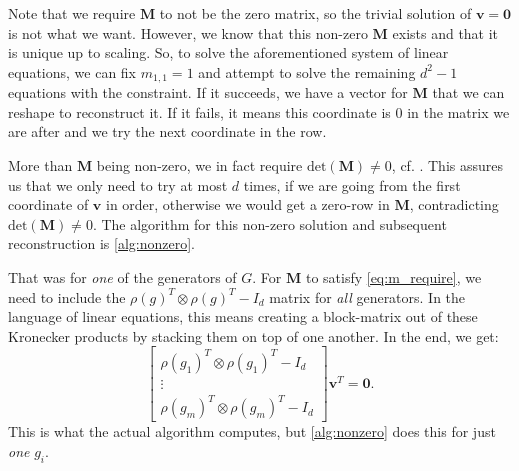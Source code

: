 \documentclass[11pt]{article}
\begin{document}
Note that we require $\mathbf{M}$ to not be the zero matrix, so the trivial solution of $\mathbf{v} = \mathbf{0}$
is not what we want. However, we know that this non-zero $\mathbf{M}$ exists and that it is unique
up to scaling. So, to solve the aforementioned system of linear equations, we can fix $m_{1,1} = 1$
and attempt to solve the remaining $d^2-1$ equations with the constraint. If it succeeds, we have
a vector for $\mathbf{M}$ that we can reshape to reconstruct it. If it fails, it means this coordinate
is $0$ in the matrix we are after and we try the next coordinate in the row.

More than $\mathbf{M}$ being non-zero, we in fact require $\text{det}(\mathbf{M}) \neq 0$, cf. \cite[Proof of Lemma 3.1]{Pas21}.
This assures us that we only need to try at most $d$ times, if we are going from the first coordinate
of $\mathbf{v}$ in order, otherwise we would get a zero-row in $\mathbf{M}$, contradicting $\text{det}(\mathbf{M}) \neq 0$.
The algorithm for this non-zero solution and subsequent reconstruction is \cref{alg:nonzero}.

That was for \textit{one} of the generators of $G$. For $\mathbf{M}$ to satisfy \cref{eq:m_require},
we need to include the $\rho(g)^T \otimes \rho(g)^T - I_d$ matrix for \textit{all} generators. In
the language of linear equations, this means creating a block-matrix out of these Kronecker products
by stacking them on top of one another. In the end, we get:
\[\begin{bmatrix} \rho(g_1)^T \otimes \rho(g_1)^T - I_d\\ \vdots \\ \rho(g_m)^T \otimes \rho(g_m)^T - I_d\end{bmatrix} \mathbf{v}^T = \mathbf{0}.\]
This is what the actual algorithm computes, but \cref{alg:nonzero} does this for just \textit{one} $g_i$.
\end{document}
